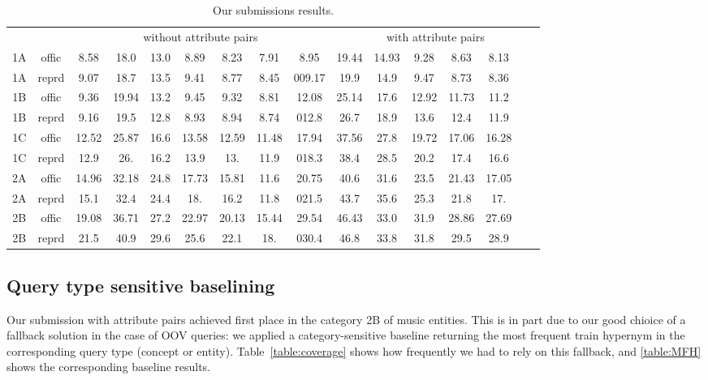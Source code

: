 \documentclass[11pt,a4paper]{article}
\begin{document}
\begin{table*}
  \begin{tabular}{cc|ccccccc|ccccccc}
&&\multicolumn{7}{c}{without attribute pairs} & \multicolumn{7}{c}{with attribute pairs} \\
    1A	&	offic	&	8.58	&	18.0	&	13.0	&	8.89	&	8.23	&	7.91	&	8.95	&	19.44	&	14.93	&	9.28	&	8.63	&	8.13	\\
    1A	&	reprd	&9.07&18.7	&13.5	&9.41&8.77&8.45&009.17	&19.9	&14.9	&9.47	&8.73	&8.36		\\
    1B	&	offic	&	9.36	&	19.94	&	13.2	&	9.45	&	9.32	&	8.81	&12.08	& 25.14	&	17.6	&	12.92	&	11.73	&	11.2	\\
    1B	&	reprd	&9.16&19.5	&12.8	&8.93&8.94&8.74&012.8	&26.7	&18.9	&13.6	&12.4	&11.9	\\
    1C	&	offic	&	12.52	&	25.87	&	16.6	&	13.58	&	12.59	&	11.48	&17.94	&	37.56	&	27.8	&	19.72	&	17.06	&	16.28	\\
    1C	&	reprd	&12.9	&26.	&16.2	&13.9	&13.	&11.9	&018.3	&38.4	&28.5	&20.2	&17.4	&16.6	\\
    2A	&	offic	&	14.96	&	32.18	&	24.8	&	17.73	&	15.81	&	11.6	&20.75	&	40.6	&	31.6	&	23.5	&	21.43	&	17.05	\\
    2A	&	reprd	&15.1	&32.4	&24.4	&18.	&16.2	&11.8	&021.5	&43.7	&35.6	&25.3	&21.8	&17.	\\
    2B	&	offic	&	19.08	&	36.71	&	27.2	&	22.97	&	20.13	&	15.44	&29.54	&	46.43	&	33.0	&	31.9	&	28.86	&	27.69	\\
    2B	&	reprd	&21.5	&40.9	&29.6	&25.6	&22.1	&18.	&030.4	&46.8	&33.8	&31.8	&29.5	&28.9	\\
  \end{tabular}
  \caption{Our submissions results.}
  \label{table:submissions}
\end{table*}

\subsection{Query type sensitive baselining}

Our submission with attribute pairs achieved first place in the category 2B of
music entities. This is in part due to our good chioice of a fallback solution
in the case of OOV queries: we applied a category-sensitive baseline returning
the most frequent train hypernym in the corresponding query type (concept or
entity).  Table~\ref{table:coverage} shows how frequently we had to rely on
this fallback, and \autoref{table:MFH} shows the corresponding baseline
results.
\end{document}
